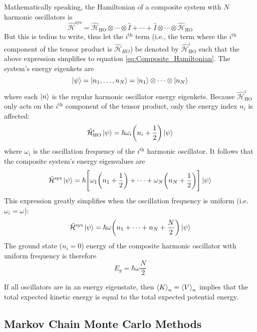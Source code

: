 \documentclass[nofootinbib,reprint,english]{revtex4-1}
\newcommand{\hatHH}{\hat{\mathcal{H}}}
\begin{document}
Mathematically speaking, the Hamiltonian of a composite system with \(N\) harmonic oscillators is
\begin{equation}
\hatHH^\text{sys}=\hatHH_\text{HO}\otimes\cdots\otimes\hat{I}+\cdots+\hat{I}\otimes\cdots\otimes\hatHH_\text{HO}
\end{equation}
But this is tedius to write, thus let the \(i^\text{th}\) term (i.e., the term where the \(i^\text{th}\) component of the tensor product is \(\hatHH_{HO}\)) be denoted by \(\hatHH_\text{HO}^i\) such that the above expression simplifies to equation \eqref{eq:Composite_Hamiltonian}. The system's energy eigenkets are
\begin{equation}
\ket{\psi}=\ket{n_1,\ldots,n_N}=\ket{n_1}\otimes\cdots\otimes\ket{n_N}
\end{equation}
where each \(\ket{n}\) is the regular harmonic oscillator energy eigenkets. Because \(\hatHH_\text{HO}^i\) only acts on the \(i^\text{th}\) component of the tensor product, only the energy index \(n_i\) is affected:
\begin{equation}
\hatHH_\text{HO}^i\ket{\psi}=\hbar\omega_i\bigg(n_i+\frac{1}{2}\bigg)\ket{\psi}
\end{equation}
where \(\omega_i\) is the oscillation frequency of the \(i^\text{th}\) harmonic oscillator. It follows that the composite system's energy eigenvalues are
\begin{equation}\label{eq:composite_harmonic_oscillator_energy}
\hatHH^\text{sys}\ket{\psi}=\hbar\Bigg[\omega_1\bigg(n_1+\frac{1}{2}\bigg)+\cdots+\omega_N\bigg(n_N+\frac{1}{2}\bigg)\Bigg]\ket{\psi}
\end{equation}
This expression greatly simplifies when the oscillation frequency is uniform (i.e. \(\omega_i=\omega\)):
\begin{equation}\label{eq:composite_harmonic_oscillator_energy_unifreq}
\hatHH^\text{sys}\ket{\psi}=\hbar\omega\bigg(n_1+\cdots+n_N+\frac{N}{2}\bigg)\ket{\psi}
\end{equation}
The ground state (\(n_i=0\)) energy of the composite harmonic oscillator with uniform frequency is therefore
\begin{equation}\label{eq:composite_harmonic_oscillator_ground_energy}
E_g=\hbar\omega\frac{N}{2}
\end{equation}

If all oscillators are in an energy eigenstate, then \(\expval{K}_n=\expval{V}_n\) implies that the total expected kinetic energy is equal to the total expected potential energy.
\subsection{Markov Chain Monte Carlo Methods}
\end{document}
